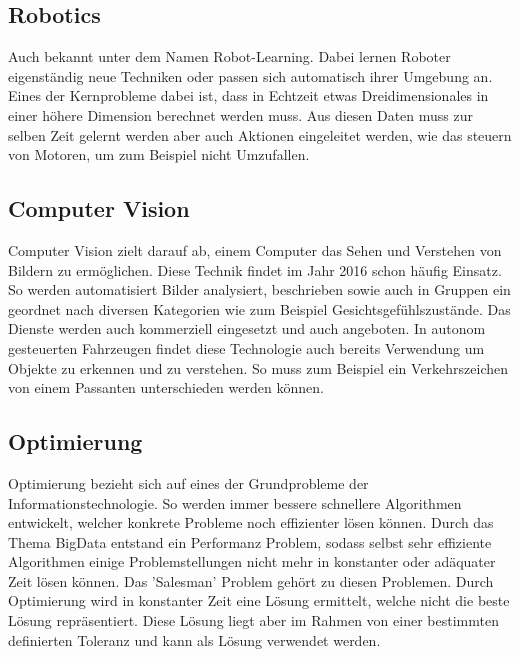 \subsection{Robotics}
\label{subsec:Robotics}

Auch bekannt unter dem Namen Robot-Learning. 
Dabei lernen Roboter eigenständig neue Techniken oder passen sich automatisch ihrer Umgebung an. 
Eines der Kernprobleme dabei ist, dass in Echtzeit etwas Dreidimensionales in einer höhere Dimension berechnet werden muss.
Aus diesen Daten muss zur selben Zeit gelernt werden aber auch Aktionen eingeleitet werden, wie das steuern von Motoren, um zum Beispiel nicht Umzufallen.

\subsection{Computer Vision}
\label{subsec:Cumputer Vision}

Computer Vision zielt darauf ab, einem Computer das Sehen und Verstehen von Bildern zu ermöglichen. 
Diese Technik findet im Jahr 2016 schon häufig Einsatz. 
So werden automatisiert Bilder analysiert, beschrieben sowie auch in Gruppen ein geordnet nach diversen Kategorien wie zum Beispiel Gesichtsgefühlszustände.
Das Dienste werden auch kommerziell eingesetzt und auch angeboten. 
In autonom gesteuerten Fahrzeugen findet diese Technologie auch bereits Verwendung um Objekte zu erkennen und zu verstehen. 
So muss zum Beispiel ein Verkehrszeichen von einem Passanten unterschieden werden können.

\subsection{Optimierung}
\label{subsec:Optimization}

Optimierung bezieht sich auf eines der Grundprobleme der Informationstechnologie. 
So werden immer bessere schnellere Algorithmen entwickelt, welcher konkrete Probleme noch effizienter lösen können. 
Durch das Thema BigData entstand ein Performanz Problem, sodass selbst sehr effiziente Algorithmen einige Problemstellungen nicht mehr in konstanter oder adäquater Zeit lösen können. 
Das 'Salesman' Problem gehört zu diesen Problemen. 
Durch Optimierung wird in konstanter Zeit eine Lösung ermittelt, welche nicht die beste Lösung repräsentiert. 
Diese Lösung liegt aber im Rahmen von einer bestimmten definierten Toleranz und kann als Lösung verwendet werden. \cite{AI3}

